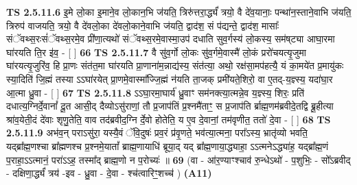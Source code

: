 \documentclass[17pt]{extarticle}
\begin{document}
                  \newline
                                \textbf{ TS 2.5.11.6} \newline
                  इ॒मे लो॒का इ॒माने॒व लो॒कान॒भि ज॑यति॒ त्रिरु॑त्तरा॒र्द्ध्यं॑ त्रयो॒ वै दे॑व॒यानाः॒ पन्था॑न॒स्ताने॒वाभि ज॑यति॒ त्रिरुप॑ वाजयति॒ त्रयो॒ वै दे॑वलो॒का दे॑वलो॒काने॒वाभि ज॑यति॒ द्वाद॑श॒ सं प॑द्यन्ते॒ द्वाद॑श॒ मासाः᳚ संॅवथ्स॒रःसं॑ॅवथ्स॒रमे॒व प्री॑णा॒त्यथो॑ संॅवथ्स॒रमे॒वास्मा॒उप॑ दधाति सुव॒र्गस्य॑ लो॒कस्य॒ सम॑ष्‌ट्या आघा॒रमा घा॑रयति ति॒र इ॑व॒ - [  ] \textbf{  66} \newline
                  \newline
                                \textbf{ TS 2.5.11.7} \newline
                  वै सु॑व॒र्गो लो॒कः सु॑व॒र्गमे॒वास्मै॑ लो॒कं प्ररो॑चयत्यृ॒जुमा घा॑रयत्यृ॒जुरि॑व॒ हि प्रा॒णः संत॑त॒मा घा॑रयति प्रा॒णाना॑म॒न्नाद्य॑स्य॒ संत॑त्या॒ अथो॒ रक्ष॑सा॒मप॑हत्यै॒ यं का॒मये॑त प्र॒मायु॑कः स्या॒दिति॑ जि॒ह्मं तस्या ऽऽघा॑रयेत् प्रा॒णमे॒वास्मा᳚ज्जि॒ह्मं न॑यति ता॒जक् प्रमी॑यते॒शिरो॒ वा ए॒तद्-य॒ज्ञ्स्य॒ यदा॑घा॒र आ॒त्मा ध्रु॒वा - [  ] \textbf{  67} \newline
                  \newline
                                \textbf{ TS 2.5.11.8} \newline
                  ऽऽघा॒रमा॒घार्य॑ ध्रु॒वाꣳ सम॑नक्त्या॒त्मन्ने॒व य॒ज्ञ्स्य॒ शिरः॒ प्रति॑ दधात्य॒ग्निर्दे॒वानां᳚ दू॒त आसी॒द् दैव्योऽसु॑राणां॒ तौ प्र॒जाप॑तिं प्र॒श्नमै॑ताꣳ॒॒ स प्र॒जाप॑ति र्ब्राह्म॒णम॑ब्रवीदे॒तद्वि ब्रू॒हीत्या श्रा॑व॒येती॒दं दे॑वाः शृणु॒तेति॒ वाव तद॑ब्रवीद॒ग्नि र्दे॒वो होतेति॒ य ए॒व दे॒वानां॒ तम॑वृणीत॒ ततो॑ दे॒वा - [  ] \textbf{  68} \newline
                  \newline
                                \textbf{ TS 2.5.11.9} \newline
                  अभ॑व॒न् पराऽसु॑रा॒ यस्यै॒वं ॅवि॒दुषः॑ प्रव॒रं प्र॑वृ॒णते॒ भव॑त्या॒त्मना॒ परा᳚ऽस्य॒ भ्रातृ॑व्यो भवति॒ यद्ब्रा᳚ह्म॒णश्चा ब्रा᳚ह्मणश्च प्र॒श्नमे॒यातां᳚ ब्राह्म॒णायाधि॑ ब्रूया॒द् यद् ब्रा᳚ह्म॒णाया॒द्ध्याहा॒ ऽऽत्मनेऽद्ध्या॑ह॒ यद्ब्रा᳚ह्म॒णं प॒राहा॒ऽऽत्मानं॒ परा॑ऽऽह॒ तस्मा᳚द् ब्राह्म॒णो न प॒रोच्यः॑ ॥ \textbf{  69} \newline
                  \newline
                      (वा - आ॑र॒ण्याꣳश्चाव॑ रु॒न्धेऽथो॑ - प॒शुभिः॒ - सो᳚ऽब्रवीद् - दक्षिणा॒र्द्ध्यं॑ त्रय॑ -इव - ध्रु॒वा - दे॒वा - श्च॑त्वारिꣳ॒॒शच्च॑ )  \textbf{(A11)} \newline \newline
\end{document}
